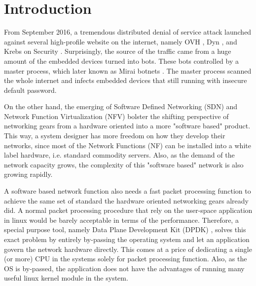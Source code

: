 \documentclass[sigplan,screen]{acmart}
\begin{document}

\maketitle

\section{Introduction}
From September 2016, a tremendous distributed denial of service attack launched against several high-profile website on the internet, namely OVH \cite{ovh}, Dyn \cite{dyn}, and Krebs on Security \cite{kos}. Surprisingly, the source of the traffic came from a huge amount of the embedded devices turned into bots. These bots controlled by a master process, which later known as Mirai botnets \cite{203628}. The master process scanned the whole internet and infects embedded devices that still running with insecure default password. 

On the other hand, the emerging of Software Defined Networking (SDN) and Network Function Virtualization (NFV) bolster the shifting perspective of networking gears from a hardware oriented into a more "software based" product. This way, a system designer has more freedom on how they develop their networks, since most of the Network Functions (NF) can be installed into a white label hardware, i.e. standard commodity servers. Also, as the demand of the network capacity grows, the complexity of this "software based" network is also growing rapidly.

A software based network function also needs a fast packet processing function to achieve the same set of standard the hardware oriented networking gears already did. A normal packet processing procedure that rely on the user-space application in linux would be barely acceptable in terms of the performance. Therefore, a special purpose tool, namely Data Plane Development Kit (DPDK) \citep{dpdk}, solves this exact problem by entirely by-passing the operating system and let an application govern the network hardware directly. This comes at a price of dedicating a single (or more) CPU in the systems solely for packet processing function. Also, as the OS is by-passed, the application does not have the advantages of running many useful linux kernel module in the system.
\end{document}
